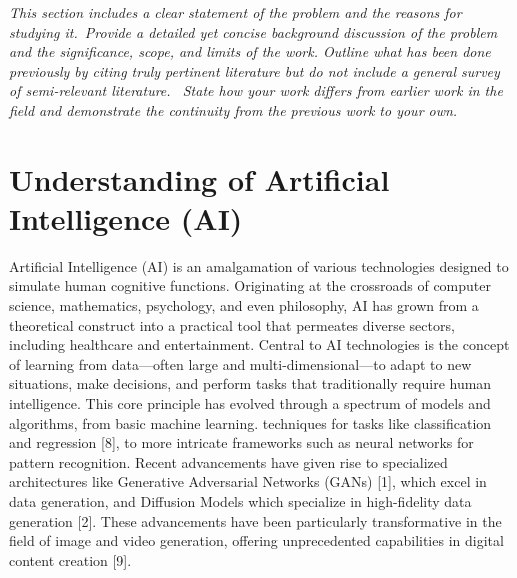 \documentclass[11pt,a4paper,oneside]{report}
\newcommand{\instructions}[1]{{\color{black}\itshape #1}}
\begin{document}
\instructions{This section includes a clear statement of the problem and the
reasons for studying it.~Provide a detailed yet concise background
discussion of the problem and the significance, scope, and limits of the
work. Outline what has been done previously by citing truly pertinent
literature but do not include a general survey of semi-relevant
literature.~ State how your work differs from earlier work in the field
and demonstrate the continuity from the previous work to your own.

\section{Understanding of Artificial Intelligence (AI)}
Artificial Intelligence (AI) is an amalgamation of various technologies designed to simulate human cognitive functions. 
Originating at the crossroads of computer science, mathematics, psychology, and even philosophy, 
AI has grown from a theoretical construct into a practical tool that permeates diverse sectors, 
including healthcare and entertainment. 
Central to AI technologies is the concept of learning from data—often large and multi-dimensional—to adapt to new situations, make decisions, and perform tasks that traditionally require human intelligence. 
This core principle has evolved through a spectrum of models and algorithms, from basic machine learning. 
techniques for tasks like classification and regression [8], to more intricate frameworks such as neural networks for pattern recognition. 
Recent advancements have given rise to specialized architectures like Generative Adversarial Networks (GANs) [1], which excel in data generation, and Diffusion Models which specialize in high-fidelity data generation [2]. 
These advancements have been particularly transformative in the field of image and video generation, offering unprecedented capabilities in digital content creation [9]. 

}
\end{document}

